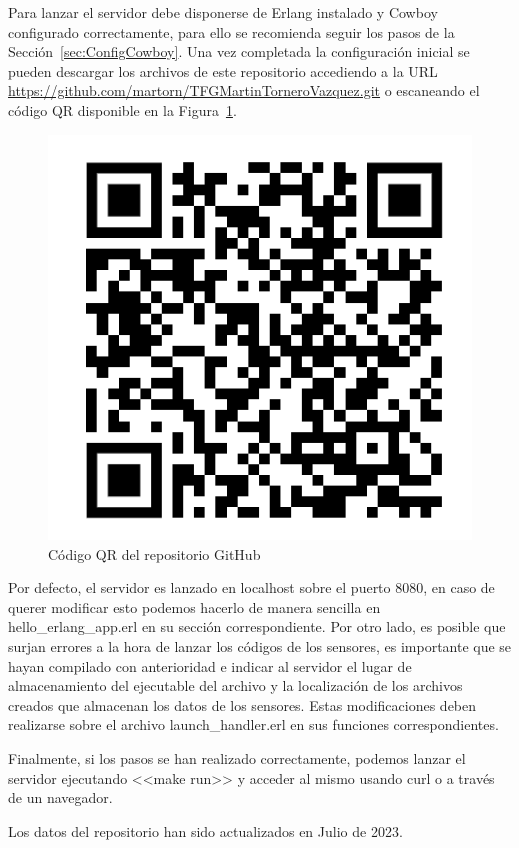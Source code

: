 Para lanzar el servidor debe disponerse de Erlang instalado y Cowboy configurado correctamente, para ello se recomienda seguir los pasos de la Sección~\ref{sec:ConfigCowboy}. Una vez completada la configuración inicial se pueden descargar los archivos de este repositorio accediendo a la URL \url{https://github.com/martorn/TFGMartinTorneroVazquez.git} o escaneando el código QR disponible en la Figura~\ref{fig:QR}.

\begin{figure}[h]
\centering
\includegraphics[scale=0.48]{images/qr.png}
\caption{Código QR del repositorio GitHub}%
\label{fig:QR}
\end{figure}
    

Por defecto, el servidor es lanzado en localhost sobre el puerto 8080, en caso de querer modificar esto podemos hacerlo de manera sencilla en hello\_erlang\_app.erl en su sección correspondiente. Por otro lado, es posible que surjan errores a la hora de lanzar los códigos de los sensores, es importante que se hayan compilado con anterioridad e indicar al servidor el lugar de almacenamiento del ejecutable del archivo y la localización de los archivos creados que almacenan los datos de los sensores. Estas modificaciones deben realizarse sobre el archivo launch\_handler.erl en sus funciones correspondientes.

Finalmente, si los pasos se han realizado correctamente, podemos lanzar el servidor ejecutando <<make run>> y acceder al mismo usando curl o a través de un navegador.

Los datos del repositorio han sido actualizados en Julio de 2023.